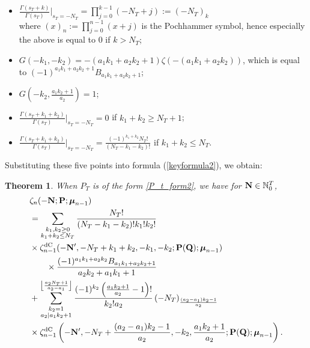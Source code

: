 \documentclass[a4paper,12pt]{article}
\newtheorem{thm}{Theorem}
\theoremstyle{definition}
\numberwithin{equation}{section}
\def\N{{\mathbb N}}
\def\Nb{{\bf N}}
\def\P{{\bf P}}
\newcommand{\mub}{\boldsymbol{\mu}}
\newcommand{\dc}{\mathrm{dC}}
\begin{document}
\begin{itemize}
\item[$\bullet$] $\displaystyle \frac{\Gamma (s_T+k)}{\Gamma (s_T)}\Big|_{s_T=-N_T}= \prod_{j=0}^{k-1}(-N_T+j) :=(-N_T)_{k}$\\ where $(x)_n:=\prod_{j=0}^{n-1} (x+j)$ is the Pochhammer symbol,
hence especially the above is equal to $0$ if $k>N_T$;
\item[$\bullet$] $\displaystyle G(-k_1, -k_2) = -(a_1k_1+a_2k_2+1) \zeta \left(-(a_1k_1+a_2k_2)\right)$, 
which is equal to
$(-1)^{a_1k_1+a_2k_2+1} B_{a_1k_1+a_2k_2+1}$;
\item[$\bullet$] $G\left(- k_2, \frac{a_1 k_2+1}{a_2}\right)=1$; 
\item[$\bullet$] $\displaystyle \frac{\Gamma (s_T+k_1+k_2)}{\Gamma (s_T)}\Big|_{s_T=-N_T}= 0$ if $k_1+k_2 \geq N_T+1$;
\item[$\bullet$] $\displaystyle \frac{\Gamma (s_T+k_1+k_2)}{\Gamma (s_T)}\Big|_{s_T=-N_T}= \frac{(-1)^{k_1+k_2}N_T!}{(N_T-k_1-k_2)!}$ if $k_1+k_2 \leq N_T$.
\end{itemize}
Substituting these five points into formula (\ref{keyformula2}), we obtain:
\begin{thm}\label{thm_d=2}
When $P_T$ is of the form \eqref{P_t_form2}, we have for $\Nb \in \N_0^T$, 
\begin{align}\label{keyformula3}
&\zeta_n(-\Nb;\P;\mub_{n-1})\notag\\
&=\sum_{\substack{k_1, k_2 \geq 0 \\ k_1+k_2 \leq N_T}}\frac{N_T !}{(N_T-k_1-k_2)! k_1! k_2!}  \notag \\
&\times\zeta_{n-1}^{\dc}(-\Nb', -N_T+k_1+k_2, -k_1, -k_2; \mathbf{P(Q)};\boldsymbol{\mu}_{n-1})\notag\\
&\qquad\times\frac{(-1)^{a_1k_1+a_2k_2} B_{a_1k_1+a_2k_2+1}}{a_2k_2+a_1k_1+1}
\notag\\
&  + \sum_{\substack{k_2=1 \\ a_2  | a_1 k_2+1}}^{\left\lfloor\frac{a_2 N_T+1}{a_2-a_1}\right\rfloor}\frac{(-1)^{k_2}
\left(\frac{a_1 k_2+1}{a_2}-1\right)!}{k_2! a_2}
\left(-N_T\right)_{\frac{(a_2-a_1)k_2-1}{a_2}} \notag 
\\
& \times\zeta_{n-1}^{\dc}\left(-\Nb', -N_T+\frac{(a_2-a_1)k_2-1}{a_2}, - k_2, \frac{a_1k_2+1}{a_2}; \mathbf{P(Q)};\boldsymbol{\mu}_{n-1}\right).
\end{align}
\end{thm}
\end{document}
